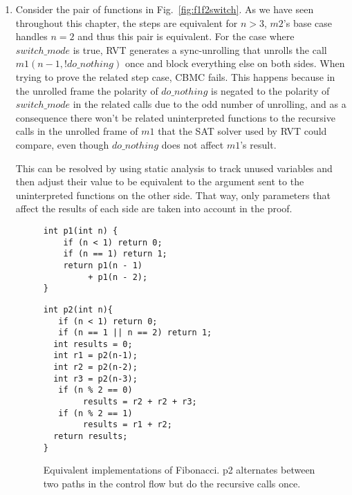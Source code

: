 \begin{enumerate}
	\item 
Consider the pair of functions in Fig.~\ref{fig:f1f2switch}. As we have seen throughout this chapter, the steps are equivalent for $n > 3$, $m2$'s base case handles $n=2$ and thus this pair is equivalent. For the case where $switch\_mode$ is true, RVT generates a sync-unrolling that unrolls the call $m1(n-1,!do\_nothing)$ once and block everything else on both sides. When trying to prove the related step case, CBMC fails. This happens because in the unrolled frame the polarity of $do\_nothing$ is negated to the polarity of $switch\_mode$ in the related calls due to the odd number of unrolling, and as a consequence there won't be related uninterpreted functions to the recursive calls in the unrolled frame of $m1$ that the SAT solver used by RVT could compare, even though $do\_nothing$ does not affect $m1$'s result.

This can be resolved by using static analysis to track unused variables and then adjust their value to be equivalent to the argument sent to the uninterpreted functions on the other side. That way, only parameters that affect the results of each side are taken into account in the proof.


\begin{figure}[h]
\begin{center}
\begin{minipage}{7 cm}
\begin{lstlisting}
int p1(int n) {
    if (n < 1) return 0;
    if (n == 1) return 1;
    return p1(n - 1) 
         + p1(n - 2);
}
\end{lstlisting}
\end{minipage}
\begin{minipage}{7 cm}
\begin{lstlisting}
int p2(int n){
   if (n < 1) return 0;
   if (n == 1 || n == 2) return 1; 
  int results = 0;
  int r1 = p2(n-1);
  int r2 = p2(n-2);
  int r3 = p2(n-3);
   if (n % 2 == 0)
        results = r2 + r2 + r3;
   if (n % 2 == 1)
        results = r1 + r2;
  return results;
}
\end{lstlisting}
\end{minipage}
\caption{Equivalent implementations of Fibonacci. p2 alternates between two paths in the control flow but do the recursive calls once.}
\label{fig:redundentcalls}
\end{center}
\end{figure}


\end{enumerate}
